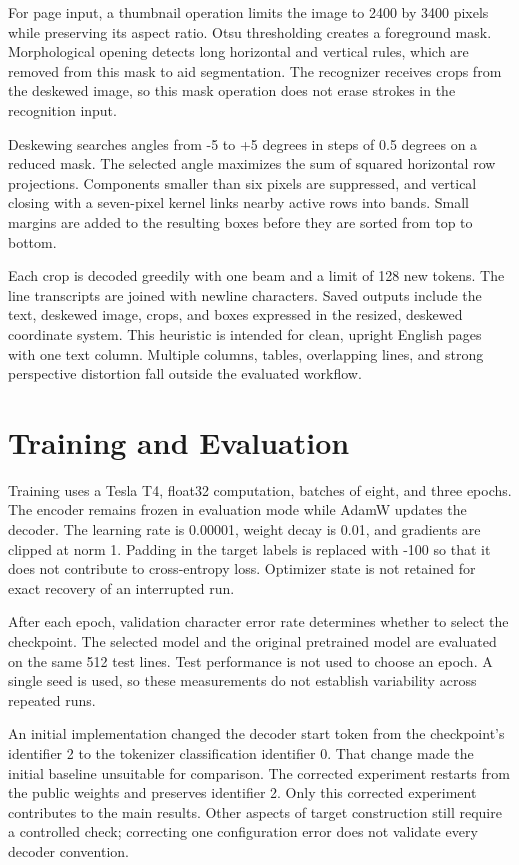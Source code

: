 \documentclass[conference]{IEEEtran}
\begin{document}
For page input, a thumbnail operation limits the image to 2400 by 3400 pixels while preserving its aspect ratio. Otsu thresholding creates a foreground mask. Morphological opening detects long horizontal and vertical rules, which are removed from this mask to aid segmentation. The recognizer receives crops from the deskewed image, so this mask operation does not erase strokes in the recognition input.

Deskewing searches angles from -5 to +5 degrees in steps of 0.5 degrees on a reduced mask. The selected angle maximizes the sum of squared horizontal row projections. Components smaller than six pixels are suppressed, and vertical closing with a seven-pixel kernel links nearby active rows into bands. Small margins are added to the resulting boxes before they are sorted from top to bottom.

Each crop is decoded greedily with one beam and a limit of 128 new tokens. The line transcripts are joined with newline characters. Saved outputs include the text, deskewed image, crops, and boxes expressed in the resized, deskewed coordinate system. This heuristic is intended for clean, upright English pages with one text column. Multiple columns, tables, overlapping lines, and strong perspective distortion fall outside the evaluated workflow.
\section{Training and Evaluation}
Training uses a Tesla T4, float32 computation, batches of eight, and three epochs. The encoder remains frozen in evaluation mode while AdamW updates the decoder. The learning rate is 0.00001, weight decay is 0.01, and gradients are clipped at norm 1. Padding in the target labels is replaced with -100 so that it does not contribute to cross-entropy loss. Optimizer state is not retained for exact recovery of an interrupted run.

After each epoch, validation character error rate determines whether to select the checkpoint. The selected model and the original pretrained model are evaluated on the same 512 test lines. Test performance is not used to choose an epoch. A single seed is used, so these measurements do not establish variability across repeated runs.

An initial implementation changed the decoder start token from the checkpoint's identifier 2 to the tokenizer classification identifier 0. That change made the initial baseline unsuitable for comparison. The corrected experiment restarts from the public weights and preserves identifier 2. Only this corrected experiment contributes to the main results. Other aspects of target construction still require a controlled check; correcting one configuration error does not validate every decoder convention.
\end{document}

